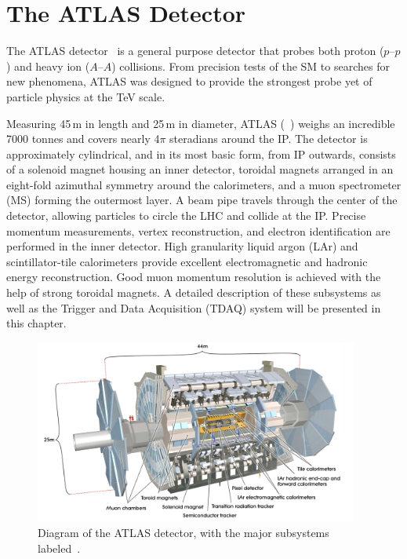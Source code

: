 \chapter{The ATLAS Detector}
\label{ch:atlas}

The ATLAS detector~\cite{ATLAS} is a general purpose detector that probes both proton ($p$--$p$) and heavy ion ($A$--$A$) collisions. From precision tests of the SM to searches for new phenomena, ATLAS was designed to provide the strongest probe yet of particle physics at the TeV scale. 

Measuring 45\,m in length and 25\,m in diameter, ATLAS (~\Fig{\ref{fig:atlas_detector}}) weighs an incredible 7000 tonnes and covers nearly 4$\pi$ steradians around the IP. The detector is approximately cylindrical, and in its most basic form, from IP outwards, consists of a solenoid magnet housing an inner detector, toroidal magnets arranged in an eight-fold azimuthal symmetry around the calorimeters, and a muon spectrometer (MS) forming the outermost layer. A beam pipe travels through the center of the detector, allowing particles to circle the LHC and collide at the IP. Precise momentum measurements, vertex reconstruction, and electron identification are performed in the inner detector. High granularity liquid argon (LAr) and scintillator-tile calorimeters provide excellent electromagnetic and hadronic energy reconstruction. Good muon momentum resolution is achieved with the help of strong toroidal magnets. A detailed description of these subsystems as well as the Trigger and Data Acquisition (TDAQ) system will be presented in this chapter. 
\begin{figure}[tbp]
    \centering
    \includegraphics[width=0.95\textwidth]{figures/Atlas/atlas_detector}
    \caption[Diagram of the ATLAS detector]{Diagram of the ATLAS detector, with the major subsystems labeled~\cite{ATLAS}.}
    \label{fig:atlas_detector}
\end{figure}


